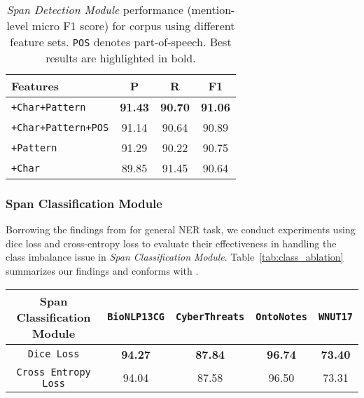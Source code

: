 
\begin{table}[h!]
\centering
\begin{small}
\begin{tabular}{lccc}\toprule
Features & P & R & F1 \\ \midrule
\texttt{+Char+Pattern} & \textbf{91.43} & \textbf{90.70} & \textbf{91.06} \\
\texttt{+Char+Pattern+POS} & 91.14 & 90.64 & 90.89 \\
\texttt{+Pattern} & 91.29 &	90.22	& 90.75 \\
\texttt{+Char} & 89.85 &	91.45 &	90.64 \\
\bottomrule
\end{tabular}
\caption{\textit{Span Detection Module} performance (mention-level micro F1 score) for  corpus using different feature sets. 
\texttt{POS} denotes part-of-speech. Best results are highlighted in bold.}
\label{tab:feature_ablation}
\end{small}
\end{table}

\subsubsection{Span Classification Module}
Borrowing the findings from \cite{li2019dice} for general NER task, we conduct experiments using dice loss and cross-entropy loss to evaluate their effectiveness in handling the class imbalance issue in \textit{Span Classification Module}. Table~\ref{tab:class_ablation} summarizes our findings and conforms with \cite{li2019dice}.

\begin{table*}[h!]
\centering
\begin{small}
\begin{tabular}{ccccc}\toprule
 Span Classification Module & \texttt{BioNLP13CG} & \texttt{CyberThreats} & \texttt{OntoNotes} & \texttt{WNUT17} \\ \toprule 
\texttt{Dice Loss} & \textbf{94.27} & \textbf{87.84} &  \textbf{96.74} & \textbf{73.40}  \\
\texttt{Cross Entropy Loss}     & 94.04 & 87.58 & 96.50 & 73.31  \\
\bottomrule
\end{tabular}
\caption{\textit{Span Classification Module} performance (mention-level micro F1 score) with different loss functions to handle class imbalance. Best results are highlighted in bold.}
\label{tab:class_ablation}
\end{small}
\end{table*}
